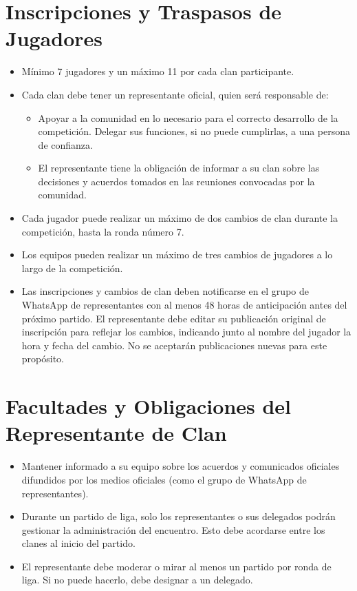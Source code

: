 \documentclass[a4paper, 11pt]{article}
\begin{document}
    \section{Inscripciones y Traspasos de Jugadores}
    
    \begin{itemize}
        \item Mínimo 7 jugadores y un máximo 11 por cada clan participante.
        \item Cada clan debe tener un representante oficial, quien será responsable de:
        \begin{itemize}
            \item Apoyar a la comunidad en lo necesario para el correcto desarrollo de la competición.
            Delegar sus funciones, si no puede cumplirlas, a una persona de confianza.
            \item El representante tiene la obligación de informar a su clan sobre las decisiones y acuerdos tomados en las reuniones convocadas por la comunidad.
        \end{itemize} 
                
        \item Cada jugador puede realizar un máximo de dos cambios de clan durante la competición, hasta la ronda número 7.
        \item Los equipos pueden realizar un máximo de tres cambios de jugadores a lo largo de la competición.
        \item Las inscripciones y cambios de clan deben notificarse en el grupo de WhatsApp de representantes con al menos 48 horas de anticipación antes del próximo partido.
        El representante debe editar su publicación original de inscripción para reflejar los cambios, indicando junto al nombre del jugador la hora y fecha del cambio. No se aceptarán publicaciones nuevas para este propósito.
      \end{itemize}
    \clearpage

    \section{Facultades y Obligaciones del Representante de Clan}
    
    \begin{itemize}
        \item Mantener informado a su equipo sobre los acuerdos y comunicados oficiales difundidos por los medios oficiales (como el grupo de WhatsApp de representantes).
        \item Durante un partido de liga, solo los representantes o sus delegados podrán gestionar la administración del encuentro. Esto debe acordarse entre los clanes al inicio del partido.
        \item El representante debe moderar o mirar al menos un partido por ronda de liga. Si no puede hacerlo, debe designar a un delegado.
    \end{itemize}
\end{document}
